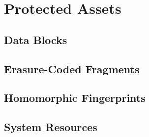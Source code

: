 \documentclass[../veristore_security_model.tex]{subfiles}
\begin{document}
\section{Protected Assets}


\subsection{Data Blocks}


\subsection{Erasure-Coded Fragments}


\subsection{Homomorphic Fingerprints}


\subsection{System Resources}


\newpage
\end{document}
